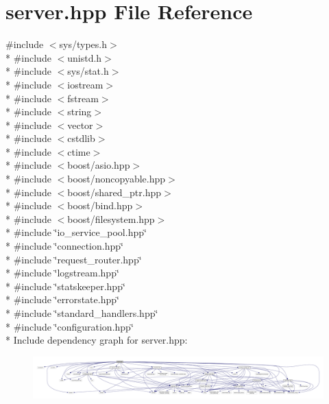 \hypertarget{a00077}{\section{server.\-hpp File Reference}
\label{a00077}
}
{\ttfamily \#include $<$sys/types.\-h$>$}\\*
{\ttfamily \#include $<$unistd.\-h$>$}\\*
{\ttfamily \#include $<$sys/stat.\-h$>$}\\*
{\ttfamily \#include $<$iostream$>$}\\*
{\ttfamily \#include $<$fstream$>$}\\*
{\ttfamily \#include $<$string$>$}\\*
{\ttfamily \#include $<$vector$>$}\\*
{\ttfamily \#include $<$cstdlib$>$}\\*
{\ttfamily \#include $<$ctime$>$}\\*
{\ttfamily \#include $<$boost/asio.\-hpp$>$}\\*
{\ttfamily \#include $<$boost/noncopyable.\-hpp$>$}\\*
{\ttfamily \#include $<$boost/shared\-\_\-ptr.\-hpp$>$}\\*
{\ttfamily \#include $<$boost/bind.\-hpp$>$}\\*
{\ttfamily \#include $<$boost/filesystem.\-hpp$>$}\\*
{\ttfamily \#include \char`\"{}io\-\_\-service\-\_\-pool.\-hpp\char`\"{}}\\*
{\ttfamily \#include \char`\"{}connection.\-hpp\char`\"{}}\\*
{\ttfamily \#include \char`\"{}request\-\_\-router.\-hpp\char`\"{}}\\*
{\ttfamily \#include \char`\"{}logstream.\-hpp\char`\"{}}\\*
{\ttfamily \#include \char`\"{}statskeeper.\-hpp\char`\"{}}\\*
{\ttfamily \#include \char`\"{}errorstate.\-hpp\char`\"{}}\\*
{\ttfamily \#include \char`\"{}standard\-\_\-handlers.\-hpp\char`\"{}}\\*
{\ttfamily \#include \char`\"{}configuration.\-hpp\char`\"{}}\\*
Include dependency graph for server.\-hpp\-:\nopagebreak
\begin{figure}[H]
\begin{center}
\leavevmode
\includegraphics[width=350pt]{a00123}
\end{center}
\end{figure}
